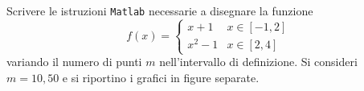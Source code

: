 Scrivere le istruzioni {\tt Matlab} necessarie a disegnare la funzione
 \[
f(x)= \left\{ \begin{array}{ll} x+1 & x \in [-1, 2] \\ x^2-1 & x \in [2, 4] \end{array} \right.
\]
variando il numero di punti $m$ nell'intervallo di definizione. Si consideri $m=10, 50$ e si riportino i grafici in figure separate. 

